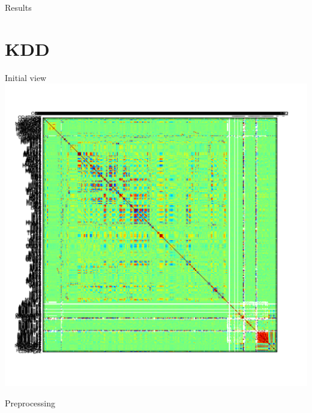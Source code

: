 \documentclass[12pt]{beamer}
\begin{document}
\begin{frame}{Results}
\resizebox{\linewidth}{!}{}
\end{frame}

\section{KDD}
\begin{frame}{Initial view}
\includegraphics[height=\textheight,width=\textwidth,keepaspectratio]{plots/kdd_orig.png}
\end{frame}

\begin{frame}{Preprocessing}

\end{frame}
\end{document}
